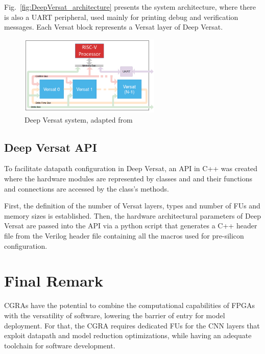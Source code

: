 Fig.~\ref{fig:DeepVersat_architecture} presents the system architecture, where
there is also a UART peripheral, used mainly for printing debug and verification
messages. Each Versat block represents a Versat layer of Deep Versat.

\begin{figure}[!htb]
	\centering
	\includegraphics[width=0.6\textwidth]{Figures/deep_versat_system_edited.png}
	\caption[Caption for figure in TOC.]{Deep Versat system, adapted from~\cite{VMario:Deep_Versat}}
	\label{fig:deep_versat_system}
\end{figure}
\subsection{Deep Versat API}
\label{sec:Versat_API}
To facilitate datapath configuration in Deep Versat, an API in C++ was created
where the hardware modules are represented by classes and and their functions and
connections are accessed by the class's methods.

First, the definition of the number of Versat layers, types and number of FUs
and memory sizes is established. Then, the hardware architectural parameters of
Deep Versat are passed into the API via a python script that generates a C++
header file from the Verilog header file containing all the macros used for
pre-silicon configuration.


\section*{Final Remark}
\label{sec:chapter3_conclusion}
CGRAs have the potential to combine the computational capabilities of FPGAs with
the versatility of software, lowering the barrier of entry for model
deployment. For that, the CGRA requires dedicated FUs for the CNN layers that
exploit datapath and model reduction optimizations, while having an adequate
toolchain for software development.
